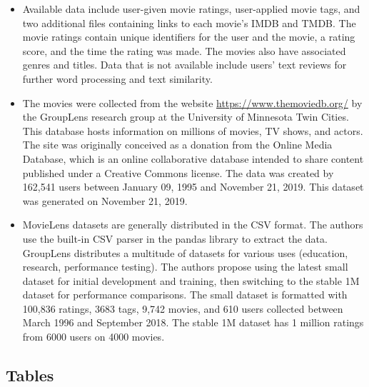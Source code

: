 \documentclass{article}
\begin{document}
\begin{itemize}
\item Available data include user-given movie ratings, user-applied movie tags, and two additional files containing links to each movie's IMDB and TMDB. The movie ratings contain unique identifiers for the user and the movie, a rating score, and the time the rating was made. The movies also have associated genres and titles. Data that is not available include users' text reviews for further word processing and text similarity.
\item The movies were collected from the website \url{https://www.themoviedb.org/} by the GroupLens research group at the University of Minnesota Twin Cities. This database hosts information on millions of movies, TV shows, and actors. The site was originally conceived as a donation from the Online Media Database, which is an online collaborative database intended to share content published under a Creative Commons license. The data was created by 162,541 users between January 09, 1995 and November 21, 2019. This dataset was generated on November 21, 2019.
\item MovieLens datasets are generally distributed in the CSV format. The authors use the built-in CSV parser in the pandas library to extract the data. GroupLens distributes a multitude of datasets for various uses (education, research, performance testing). The authors propose using the latest small dataset for initial development and training, then switching to the stable 1M dataset for performance comparisons. The small dataset is formatted with 100,836 ratings, 3683 tags, 9,742 movies, and 610 users collected between March 1996 and September 2018. The stable 1M dataset has 1 million ratings from 6000 users on 4000 movies.

\end{itemize}




\subsection{Tables}
\end{document}
